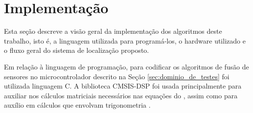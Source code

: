 \documentclass[acronym, symbols, table]{fei}
\begin{document}
%	
%		
%		
%		
		
	\section{Implementação}
	
		Esta seção descreve a visão geral da implementação dos algoritmos deste trabalho, isto é, a linguagem utilizada para programá-los, o hardware utilizado e o fluxo geral do sistema de localização proposto.
		
		Em relação à linguagem de programação, para codificar os algoritmos de fusão de sensores no microcontrolador descrito na Seção \ref{sec:dominio_de_testes} foi utilizada linguagem C. A biblioteca CMSIS-DSP foi usada principalmente para auxiliar nos cálculos matriciais necessários nas equações do , assim como para auxílio em cálculos que envolvam trigonometria \cite{cmsis_dsp}.
		
\end{document}

